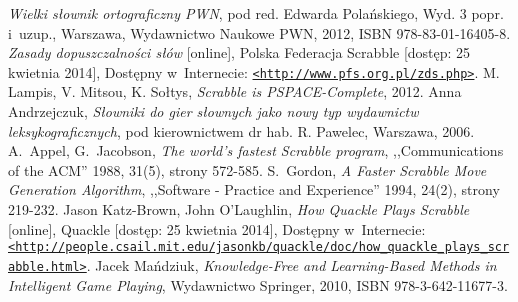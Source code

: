 \documentclass[a4paper,twocolumn,12pt]{article}
\theoremstyle{definition}
\begin{document}
\begin{thebibliography}{9}
	\small
		\emph{Wielki słownik ortograficzny PWN}, pod red. Edwarda Polańskiego, Wyd. 3 popr. i~uzup., Warszawa, Wydawnictwo Naukowe PWN, 2012, ISBN 978-83-01-16405-8.
		\emph{Zasady dopuszczalności słów} [online], Polska Federacja Scrabble [dostęp: 25 kwietnia 2014], Dostępny w~Internecie: \href{http://www.pfs.org.pl/zds.php}{\nolinkurl{<http://www.pfs.org.pl/zds.php>}}.
	 M. Lampis, V. Mitsou, K. Sołtys, \emph{Scrabble is PSPACE-Complete}, 2012.
		Anna Andrzejczuk, \emph{Słowniki do gier słownych jako nowy typ wydawnictw leksykograficznych}, pod kierownictwem dr hab. R. Pawelec, Warszawa, 2006. 
		A.~Appel, G.~Jacobson, \emph{The world's fastest Scrabble program}, ,,Communications of the ACM'' 1988, 31(5), strony 572-585.
		S.~Gordon, \emph{A Faster Scrabble Move Generation Algorithm}, ,,Software - Practice and Experience'' 1994, 24(2), strony 219-232.
		Jason Katz-Brown, John O'Laughlin, \emph{How Quackle Plays Scrabble} [online], Quackle [dostęp: 25 kwietnia 2014], Dostępny w~Internecie: \href{http://people.csail.mit.edu/jasonkb/quackle/doc/how_quackle_plays_scrabble.html}{\nolinkurl{<http://people.csail.mit.edu/jasonkb/quackle/doc/how\_quackle\_plays\_scrabble.html>}}.
		Jacek Mańdziuk, \emph{Knowledge-Free and Learning-Based Methods in Intelligent Game Playing}, Wydawnictwo Springer, 2010, ISBN 978-3-642-11677-3.
\end{thebibliography}
\end{document}
